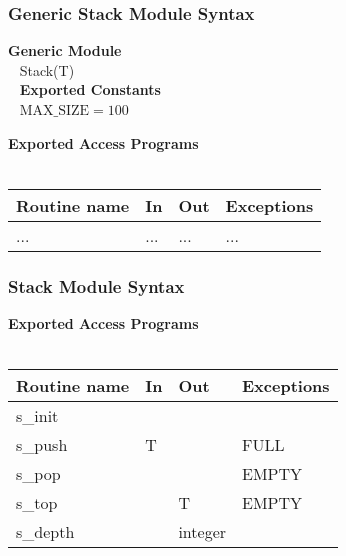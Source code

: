 \documentclass[t,12pt,numbers,fleqn]{beamer}
\begin{document}

\begin{frame}
\frametitle{Generic Stack Module Syntax}

\textbf{Generic Module}\\
~\newline
Stack(T)\\
~\newline
\textbf{Exported Constants}\\
~\newline
$\mbox{MAX\_SIZE} = 100$
~\newline

\textbf{Exported Access Programs}\\
~\newline
\begin{tabular}{| l | l | l | l |}
\hline
\textbf{Routine name} & \textbf{In} & \textbf{Out} & \textbf{Exceptions}\\
\hline
... & ... & ... & ...\\
\hline
\end{tabular}

\end{frame}


\begin{frame}
\frametitle{Stack Module Syntax}

\textbf{Exported Access Programs}\\
~\newline
\begin{tabular}{| l | l | l | l |}
\hline
\textbf{Routine name} & \textbf{In} & \textbf{Out} & \textbf{Exceptions}\\
\hline
s\_init & ~ & ~ & ~\\
\hline
s\_push & T & ~ & FULL\\
\hline
s\_pop & ~ & ~ & EMPTY\\
\hline
s\_top & ~ & T & EMPTY\\
\hline
s\_depth & ~ & integer & ~\\
\hline
\end{tabular}

\end{frame}

\end{document}
